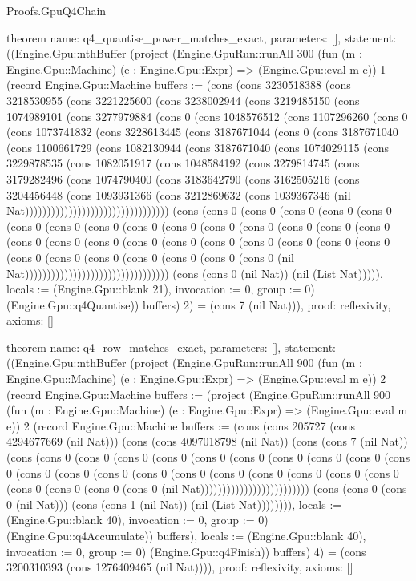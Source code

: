 \begin{lexlean}{Proofs.GpuQ4Chain}
\begin{semanticmodule}
theorem{
  name: q4_quantise_power_matches_exact,
  parameters: [],
  statement: ((Engine.Gpu::nthBuffer (project (Engine.GpuRun::runAll 300 (fun (m : Engine.Gpu::Machine) (e : Engine.Gpu::Expr) => (Engine.Gpu::eval m e)) 1 (record Engine.Gpu::Machine {buffers := (cons (cons 3230518388 (cons 3218530955 (cons 3221225600 (cons 3238002944 (cons 3219485150 (cons 1074989101 (cons 3277979884 (cons 0 (cons 1048576512 (cons 1107296260 (cons 0 (cons 1073741832 (cons 3228613445 (cons 3187671044 (cons 0 (cons 3187671040 (cons 1100661729 (cons 1082130944 (cons 3187671040 (cons 1074029115 (cons 3229878535 (cons 1082051917 (cons 1048584192 (cons 3279814745 (cons 3179282496 (cons 1074790400 (cons 3183642790 (cons 3162505216 (cons 3204456448 (cons 1093931366 (cons 3212869632 (cons 1039367346 (nil Nat))))))))))))))))))))))))))))))))) (cons (cons 0 (cons 0 (cons 0 (cons 0 (cons 0 (cons 0 (cons 0 (cons 0 (cons 0 (cons 0 (cons 0 (cons 0 (cons 0 (cons 0 (cons 0 (cons 0 (cons 0 (cons 0 (cons 0 (cons 0 (cons 0 (cons 0 (cons 0 (cons 0 (cons 0 (cons 0 (cons 0 (cons 0 (cons 0 (cons 0 (cons 0 (cons 0 (nil Nat))))))))))))))))))))))))))))))))) (cons (cons 0 (nil Nat)) (nil (List Nat))))), locals := (Engine.Gpu::blank 21), invocation := 0, group := 0}) (Engine.Gpu::q4Quantise)) buffers) 2) = (cons 7 (nil Nat))),
  proof: reflexivity{},
  axioms: []
}

theorem{
  name: q4_row_matches_exact,
  parameters: [],
  statement: ((Engine.Gpu::nthBuffer (project (Engine.GpuRun::runAll 900 (fun (m : Engine.Gpu::Machine) (e : Engine.Gpu::Expr) => (Engine.Gpu::eval m e)) 2 (record Engine.Gpu::Machine {buffers := (project (Engine.GpuRun::runAll 900 (fun (m : Engine.Gpu::Machine) (e : Engine.Gpu::Expr) => (Engine.Gpu::eval m e)) 2 (record Engine.Gpu::Machine {buffers := (cons (cons 205727 (cons 4294677669 (nil Nat))) (cons (cons 4097018798 (nil Nat)) (cons (cons 7 (nil Nat)) (cons (cons 0 (cons 0 (cons 0 (cons 0 (cons 0 (cons 0 (cons 0 (cons 0 (cons 0 (cons 0 (cons 0 (cons 0 (cons 0 (cons 0 (cons 0 (cons 0 (cons 0 (cons 0 (cons 0 (cons 0 (cons 0 (cons 0 (cons 0 (cons 0 (nil Nat))))))))))))))))))))))))) (cons (cons 0 (cons 0 (nil Nat))) (cons (cons 1 (nil Nat)) (nil (List Nat)))))))), locals := (Engine.Gpu::blank 40), invocation := 0, group := 0}) (Engine.Gpu::q4Accumulate)) buffers), locals := (Engine.Gpu::blank 40), invocation := 0, group := 0}) (Engine.Gpu::q4Finish)) buffers) 4) = (cons 3200310393 (cons 1276409465 (nil Nat)))),
  proof: reflexivity{},
  axioms: []
}


\end{semanticmodule}
\end{lexlean}
